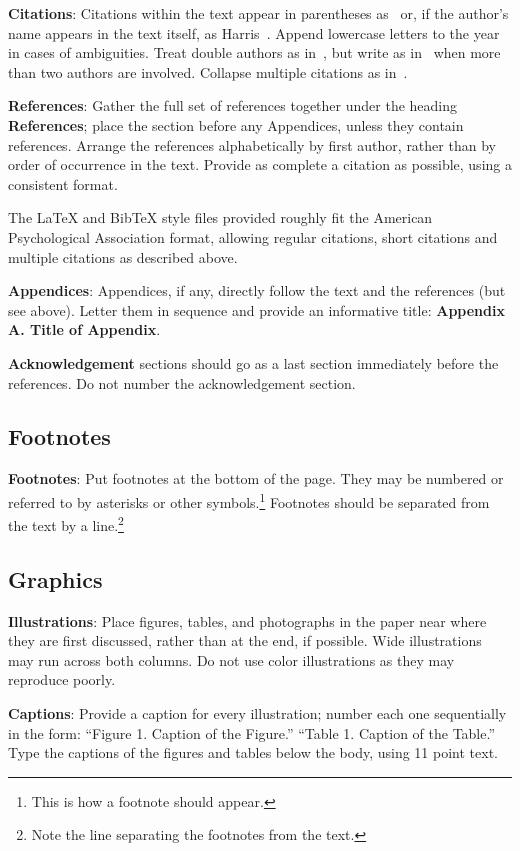 \documentclass[11pt]{article}
\begin{document}
{\bf Citations}: Citations within the text appear in parentheses
as~\cite{harris1955-phoneme} or, if the author's name appears in the
text itself, as Harris~.  Append
lowercase letters to the year in cases of ambiguities.  Treat double
authors as in~\cite{hafer1974-word}, but write as
in~\cite{hana2006-tagging} when more than two authors are involved.
Collapse multiple citations as
in~\cite{harris1967-morpheme,dejean1998-morphemes}.

\textbf{References}: Gather the full set of references together under
the heading {\bf References}; place the section before any Appendices,
unless they contain references. Arrange the references alphabetically
by first author, rather than by order of occurrence in the text.
Provide as complete a citation as possible, using a consistent format.

The \LaTeX{} and Bib\TeX{} style files provided roughly fit the
American Psychological Association format, allowing regular citations, 
short citations and multiple citations as described above.

{\bf Appendices}: Appendices, if any, directly follow the text and the
references (but see above).  Letter them in sequence and provide an
informative title: {\bf Appendix A. Title of Appendix}.

\textbf{Acknowledgement} sections should go as a last section immediately
before the references.  Do not number the acknowledgement section.

\subsection{Footnotes}

{\bf Footnotes}: Put footnotes at the bottom of the page. They may
be numbered or referred to by asterisks or other
symbols.\footnote{This is how a footnote should appear.} Footnotes
should be separated from the text by a line.\footnote{Note the
line separating the footnotes from the text.}

\subsection{Graphics}

{\bf Illustrations}: Place figures, tables, and photographs in the
paper near where they are first discussed, rather than at the end, if
possible.  Wide illustrations may run across both columns. Do not use
color illustrations as they may reproduce poorly.

{\bf Captions}: Provide a caption for every illustration; number each one
sequentially in the form:  ``Figure 1. Caption of the Figure.'' ``Table 1.
Caption of the Table.''  Type the captions of the figures and 
tables below the body, using 11 point text.  




\end{document}
